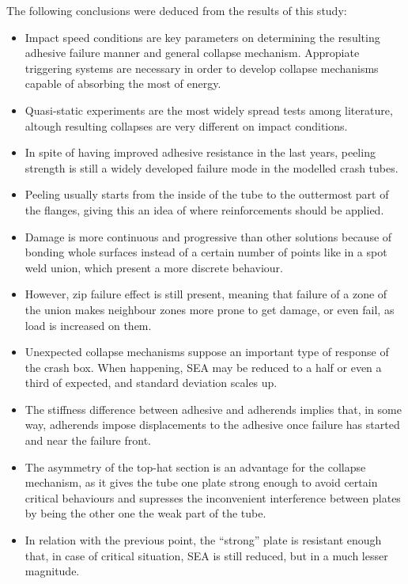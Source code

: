 \documentclass[
documentsize = a4, %
font = cmr, %
typesize = 11, %
printmode = true,
onehalfspacing = true,
language = en, %
titlepage = udciccp, %
degree = pt, %
dedication = true,
acknowledgements = true,
abstract-en = true,
abstract-es = false,
abstract-ga = false,
epigraphs = true,
toc = true,
lof = true,
lot = true,
frontmatterintoc = false,
notation = false,
minimal = false,
]{UDCthesis}
\begin{document}
The following conclusions were deduced from the results of this study:
\begin{itemize}
	\item Impact speed conditions are key parameters on determining the resulting adhesive failure manner and general collapse mechanism. Appropiate triggering systems are necessary in order to develop collapse mechanisms capable of absorbing the most of energy.

	\item Quasi-static experiments are the most widely spread tests among literature, altough resulting collapses are very different on impact conditions.

	\item In spite of having improved adhesive resistance in the last years, peeling strength is still a widely developed failure mode in the modelled crash tubes.

	\item Peeling usually starts from the inside of the tube to the outtermost part of the flanges, giving this an idea of where reinforcements should be applied.

	\item Damage is more continuous and progressive than other solutions because of bonding whole surfaces instead of a certain number of points like in a spot weld union, which present a more discrete behaviour.

	\item However, zip failure effect is still present, meaning that failure of a zone of the union makes neighbour zones more prone to get damage, or even fail, as load is increased on them.

	\item Unexpected collapse mechanisms suppose an important type of response of the crash box. When happening, \gls{SEA} may be reduced to a half or even a third of expected, and standard deviation scales up.

	\item The stiffness difference between adhesive and adherends implies that, in some way, adherends impose displacements to the adhesive once failure has started and near the failure front.

	\item The asymmetry of the top-hat section is an advantage for the collapse mechanism, as it gives the tube one plate strong enough to avoid certain critical behaviours and supresses the inconvenient interference between plates by being the other one the weak part of the tube.

	\item In relation with the previous point, the ``strong'' plate is resistant enough that, in case of critical situation, \gls{SEA} is still reduced, but in a much lesser magnitude.
\end{itemize}
\end{document}
